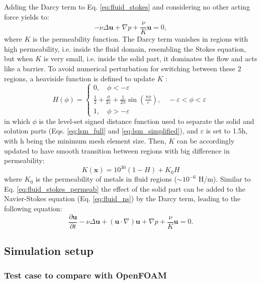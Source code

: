 Adding the Darcy  term to Eq. \ref{eq:fluid_stokes} and considering no other acting force yields to:
\begin{equation} \label{eq:fluid_stokes_permeab}
- \nu\Delta \mathbf{u} + \nabla p + \frac{\nu}{K} \mathbf{u} = 0,
\end{equation}
where $K$ is the permeability function. The Darcy term vanishes in regions with high permeability, i.e. inside the fluid domain, resembling the Stokes equation, but when $K$ is very small, i.e. inside the solid part, it dominates the flow and acts like a barrier. To avoid numerical perturbation for switching between these 2 regions, a heaviside function is defined to update $K$ \cite{Guyot2016}:
\begin{equation}
H(\phi)=\left\{\begin{array}{l}
0, \quad \phi<-\varepsilon \\
\frac{1}{2}+\frac{\phi}{2 \varepsilon}+\frac{1}{2 \pi} \sin \left(\frac{\pi \phi}{\varepsilon}\right), \quad-\varepsilon<\phi<\varepsilon \\
1, \quad \phi>-\varepsilon
\end{array}\right.
\end{equation}
in which $\phi$ is the level-set signed distance function used to separate the solid and solution parts (Eqs. \ref{eq:lsm_full} and \ref{eq:lsm_simplified}), and $\varepsilon$ is set to 1.5h, with h being the minimum mesh element size. Then, $K$ can be accordingly updated to have smooth transition between regions with big difference in permeability:
\begin{equation}
K(\boldsymbol{x})=10^{30}(1-H)+K_{0} H
\end{equation}
where $K_{0}$ is the permeability of metals in fluid regions ($\sim10^{-6}$ H/m). Similar to Eq. \ref{eq:fluid_stokes_permeab} the effect of the solid part can be added to the Navier-Stokes equation (Eq. \ref{eq:fluid_ns}) by the Darcy term, leading to the following equation: 
\begin{equation}  \label{eq:fluid_ns_permeab}
\frac{{\partial {\mathbf{u}}}}{{\partial t}} - \nu\Delta{\mathbf{u}} + \left( {{\mathbf{u}} \cdot \nabla } \right) {\mathbf{u}} + \nabla p + \frac{\nu}{K} \mathbf{u} = 0.
\end{equation}

\subsection{Simulation setup}

\subsubsection{Test case to compare with OpenFOAM}

